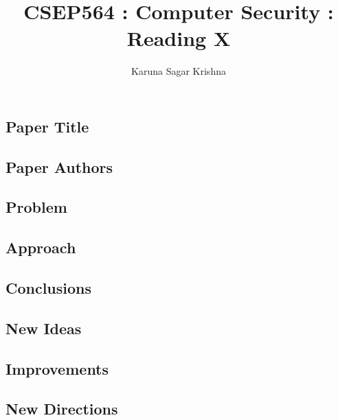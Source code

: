 \documentclass[12pt]{article}
\title{CSEP564 : Computer Security : Reading X}
\author{Karuna Sagar Krishna}
\begin{document}
    \maketitle

    \subsection*{Paper Title}
    

    \subsection*{Paper Authors}
    

    \subsection*{Problem}
    

    \subsection*{Approach}
    
    
    \subsection*{Conclusions}
    

    \subsection*{New Ideas}
    

    \subsection*{Improvements}
    

    \subsection*{New Directions}
\end{document}
